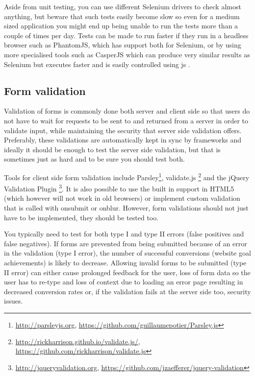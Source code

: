 \documentclass[11pt]{article}
\begin{document}
Aside from unit testing, you can use different Selenium drivers to check almost anything, but beware that such tests easily become slow so even for a medium sized application you might end up being unable to run the tests more than a couple of times per day. Tests can be made to run faster if they run in a headless browser such as PhantomJS, which has support both for Selenium, or by using more specialised tools such as CasperJS which can produce very similar results as Selenium but executes faster and is easily controlled using \gls{js} \cite[p.~142-146]{TestableJS}.

\subsection{Form validation}

Validation of forms is commonly done both server and client side so that users do not have to wait for requests to be sent to and returned from a server in order to validate input, while maintaining the security that server side validation offers. Preferably, these validations are automatically kept in sync by frameworks and ideally it should be enough to test the server side validation, but that is sometimes just as hard and to be sure you should test both.

Tools for client side form validation include Parsley\footnote{\url{http://parsleyjs.org}, \url{https://github.com/guillaumepotier/Parsley.js}}, validate.js \footnote{\url{http://rickharrison.github.io/validate.js/}, \url{https://github.com/rickharrison/validate.js}} and the jQuery Validation Plugin \footnote{\url{http://jqueryvalidation.org}, \url{https://github.com/jzaefferer/jquery-validation}}. It is also possible to use the built in support in HTML5 (which however will not work in old browsers) or implement custom validation that is called with onsubmit or onblur. However, form validations should not just have to be implemented, they should be tested too.

You typically need to test for both type I and type II errors (false positives and false negatives). If forms are prevented from being submitted because of an error in the validation (type I error), the number of successful conversions (website goal achievements) is likely to decrease. Allowing invalid forms to be submitted (type II error) can either cause prolonged feedback for the user, loss of form data so the user has to re-type and loss of context due to loading an error page resulting in decreased conversion rates or, if the validation fails at the server side too, security issues.
\end{document}

